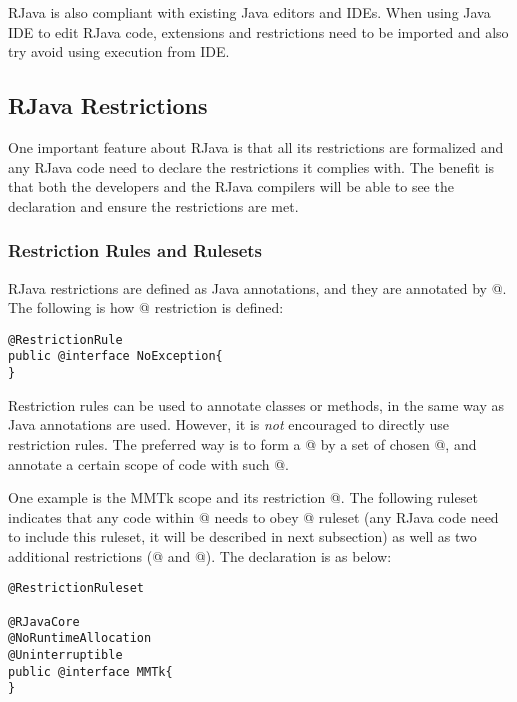 \documentclass[12pt]{article}
\begin{document}
RJava is also compliant with existing Java editors and IDEs. 
When using Java IDE to edit RJava code, extensions and restrictions
need to be imported and also try avoid using execution from IDE. 

\subsection{RJava Restrictions}

One important feature about RJava is that all its restrictions 
are formalized and any RJava code need to declare the restrictions
it complies with. The benefit is that both the developers
and the RJava compilers will be able to see the declaration
and ensure the restrictions are met. 

\subsubsection{Restriction Rules and Rulesets}

RJava restrictions are defined as Java annotations, and they are
annotated by @. 
The following is how @ restriction is defined:

\begin{lstlisting}
@RestrictionRule
public @interface NoException{
}
\end{lstlisting}

Restriction rules can be used to annotate classes or methods, in the same way as
Java annotations are used. However, it is \emph{not} encouraged to directly use
restriction rules. The preferred way is to form a @ by
a set of chosen @, and annotate a certain scope of code 
with such @. 

One example is the MMTk scope and its restriction @. The following
ruleset indicates that any code within @ needs to obey 
@ ruleset (any RJava code need to include this ruleset, it will be
described in next subsection) as well as two additional restrictions
(@ and @). The
declaration is as below:

\begin{lstlisting}
@RestrictionRuleset

@RJavaCore
@NoRuntimeAllocation
@Uninterruptible
public @interface MMTk{
}
\end{lstlisting}
\end{document}
